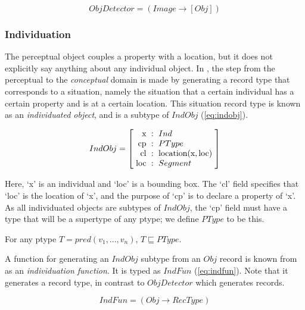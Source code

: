 \begin{equation}\label{eq:objdetector}
ObjDetector = ( Image \rightarrow [Obj] )
\end{equation}



\subsubsection{Individuation}

The perceptual object couples a property with a location, but it does not explicitly say anything about any individual object.
In \cite{lspc}, the step from the perceptual to the \textit{conceptual} domain is made by generating a record type that corresponds to a situation, namely the situation that a certain individual has a certain property and is at a certain location.
This situation record type is known as an \textit{individuated object}, and is a subtype of $IndObj$ (\autoref{eq:indobj}).

\begin{equation}\label{eq:indobj}
IndObj = \rec{
\text{x} &:& Ind \\
\text{cp} &:& PType \\
\text{cl} &:& \text{location}(\text{x}, \text{loc}) \\
\text{loc} &:& Segment \\
}
\end{equation}

Here, `x' is an individual and `loc' is a bounding box.
The `cl' field specifies that `loc' is the location of `x', and the purpose of `cp' is to declare a property of `x'.
As all individuated objects are subtypes of $IndObj$, the `cp' field must have a type that will be a supertype of any ptype; we define $PType$ to be this.

\begin{definition}
For any ptype $T = \mathit{pred}(v_1, ..., v_n)$, $T \sqsubseteq PType$.
\end{definition}

A function for generating an $IndObj$ subtype from an $Obj$ record is known from \cite{lspc} as an \textit{individuation function}.
It is typed as $IndFun$ (\autoref{eq:indfun}).
Note that it generates a record type, in contrast to $ObjDetector$ which generates records.

\begin{equation}\label{eq:indfun}
IndFun = ( Obj \rightarrow RecType )
\end{equation}

